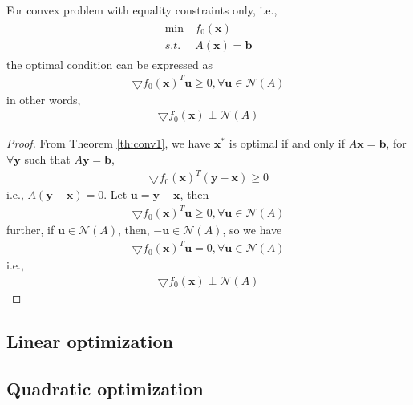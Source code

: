 \begin{lemma}
For convex problem with equality constraints only,
i.e.,
\begin{align}
    \begin{array}{ll}
        \min \ &f_0 (\mathbf{x}) \\
        s.t. \ &A (\mathbf{x}) = \mathbf{b} 
    \end{array}
\end{align}
the optimal condition can be expressed as
\begin{align}
    \bigtriangledown f_0(\mathbf{x})^T \mathbf{u}
    \geq 0, \forall \mathbf{u} \in \mathcal{N}(A)
\end{align}
in other words,
\begin{align}
    \bigtriangledown f_0(\mathbf{x}) \perp
    \mathcal{N}(A)
\end{align}
\end{lemma}

\begin{proof}
    From Theorem \ref{th:conv1}, we have
    $\mathbf{x}^*$ is optimal if and only if
    $A\mathbf{x} = \mathbf{b}$, for $\forall \mathbf{y}$
    such that $A\mathbf{y} = \mathbf{b}$,
    \begin{align}
        \bigtriangledown f_0(\mathbf{x})^T (\mathbf{y}
    - \mathbf{x}) \geq 0
    \end{align}
    i.e., $A(\mathbf{y} - \mathbf{x}) = 0$.
    Let $\mathbf{u} = \mathbf{y} - \mathbf{x}$,
    then
    \begin{align}
        \bigtriangledown f_0(\mathbf{x})^T \mathbf{u}
        \geq 0, \forall \mathbf{u} \in \mathcal{N}(A)
    \end{align}
    further, if $\mathbf{u} \in \mathcal{N}(A)$,
    then, $-\mathbf{u} \in \mathcal{N}(A)$, so we have
    \begin{align}
        \bigtriangledown f_0(\mathbf{x})^T \mathbf{u}
        = 0, \forall \mathbf{u} \in \mathcal{N}(A)
    \end{align}
    i.e.,
    \begin{align}
        \bigtriangledown f_0(\mathbf{x}) \perp
        \mathcal{N}(A)
    \end{align}
\end{proof}

\subsection{Linear optimization}

\subsection{Quadratic optimization}

